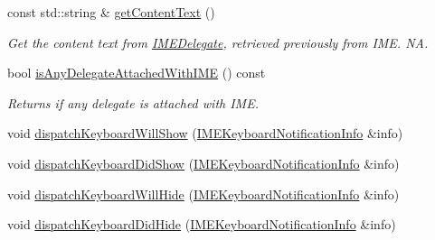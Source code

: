 \begin{DoxyCompactItemize}
\mbox{\label{classIMEDispatcher_a4621c19938ebc654e9cfcb2edd382d58}} 
const std\+::string \& \hyperlink{classIMEDispatcher_a4621c19938ebc654e9cfcb2edd382d58}{get\+Content\+Text} ()
\begin{DoxyCompactList}\small\item\em Get the content text from \hyperlink{classIMEDelegate}{I\+M\+E\+Delegate}, retrieved previously from I\+ME.  NA. \end{DoxyCompactList}\item 
\mbox{\label{classIMEDispatcher_ac8a84e6769fc7d266281ac1d81a80205}} 
bool \hyperlink{classIMEDispatcher_ac8a84e6769fc7d266281ac1d81a80205}{is\+Any\+Delegate\+Attached\+With\+I\+ME} () const
\begin{DoxyCompactList}\small\item\em Returns if any delegate is attached with I\+ME. \end{DoxyCompactList}\item 
void \hyperlink{classIMEDispatcher_a51d272229b8a061bdf38ee460c2fba03}{dispatch\+Keyboard\+Will\+Show} (\hyperlink{structIMEKeyboardNotificationInfo}{I\+M\+E\+Keyboard\+Notification\+Info} \&info)
\item 
void \hyperlink{classIMEDispatcher_af5fab401ef02cb038de32f2b8f525284}{dispatch\+Keyboard\+Did\+Show} (\hyperlink{structIMEKeyboardNotificationInfo}{I\+M\+E\+Keyboard\+Notification\+Info} \&info)
\item 
void \hyperlink{classIMEDispatcher_aec4b9bee27550e70c9b78e7b2ed5f138}{dispatch\+Keyboard\+Will\+Hide} (\hyperlink{structIMEKeyboardNotificationInfo}{I\+M\+E\+Keyboard\+Notification\+Info} \&info)
\item 
void \hyperlink{classIMEDispatcher_a60699adf2ac55bcb25d1b7782299ec6e}{dispatch\+Keyboard\+Did\+Hide} (\hyperlink{structIMEKeyboardNotificationInfo}{I\+M\+E\+Keyboard\+Notification\+Info} \&info)
\end{DoxyCompactItemize}
